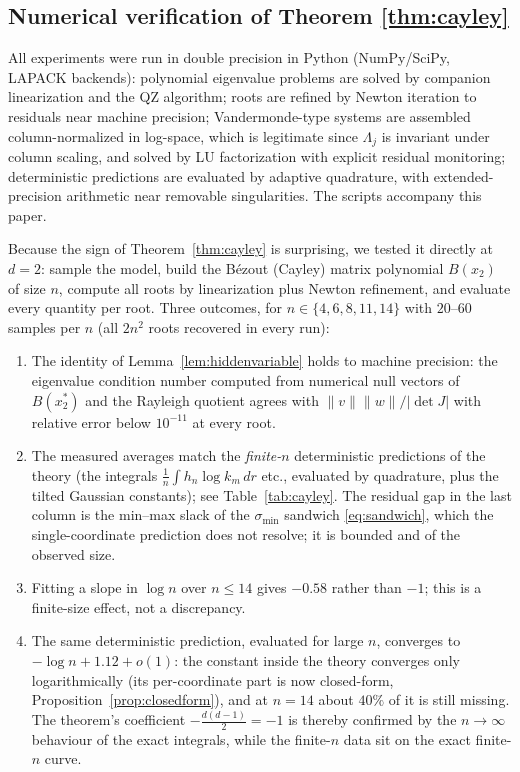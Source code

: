 \subsection{Numerical verification of Theorem \ref{thm:cayley}}\label{sec:verification}

All experiments were run in double precision in Python (NumPy/SciPy, LAPACK backends):
polynomial eigenvalue problems are solved by companion linearization and the QZ algorithm;
roots are refined by Newton iteration to residuals near machine precision;
Vandermonde-type systems are assembled column-normalized in log-space, which is legitimate
since $\Lambda_j$ is invariant under column scaling, and solved by LU factorization with
explicit residual monitoring; deterministic predictions are evaluated by adaptive
quadrature, with extended-precision arithmetic near removable singularities. The scripts
accompany this paper.

Because the sign of Theorem~\ref{thm:cayley} is surprising, we tested it directly at
$d=2$: sample the model, build the B\'ezout (Cayley) matrix polynomial $B(x_2)$ of size
$n$, compute all roots by linearization plus Newton refinement, and evaluate every quantity
per root. Three outcomes, for $n\in\{4,6,8,11,14\}$ with $20$--$60$ samples per $n$ (all
$2n^2$ roots recovered in every run):
\begin{enumerate}[(1)]
  \item The identity of Lemma~\ref{lem:hiddenvariable} holds to machine precision: the
    eigenvalue condition number computed from numerical null vectors of $B(x_2^*)$ and the
    Rayleigh quotient agrees with $\|v\|\|w\|/|\det J|$ with relative error below
    $10^{-11}$ at every root.
  \item The measured averages match the \emph{finite-$n$} deterministic predictions of the
    theory (the integrals $\frac1n\int h_n\log k_m\,dr$ etc., evaluated by quadrature, plus
    the tilted Gaussian constants); see Table~\ref{tab:cayley}. The residual gap in the
    last column is the min--max slack of the $\sigma_{\min}$ sandwich \eqref{eq:sandwich},
    which the single-coordinate prediction does not resolve; it is bounded and of the
    observed size.
  \item Fitting a slope in $\log n$ over $n\le14$ gives $-0.58$ rather than $-1$; this is
    a finite-size effect, not a discrepancy.
  \item The same deterministic prediction, evaluated for large $n$, converges to
    $-\log n + 1.12 + o(1)$: the constant inside the theory converges only logarithmically
    (its per-coordinate part is now closed-form, Proposition~\ref{prop:closedform}), and
    at $n=14$ about $40\%$ of it is still missing. The theorem's coefficient
    $-\frac{d(d-1)}2 = -1$ is thereby confirmed by the $n\to\infty$ behaviour of the exact
    integrals, while the finite-$n$ data sit on the exact finite-$n$ curve.
\end{enumerate}

